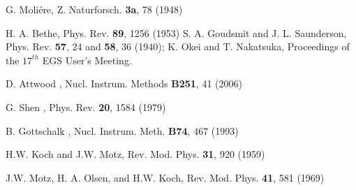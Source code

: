 
%
G. Moli\'{e}re, Z. Naturforsch. {\bf 3a}, 78 (1948)

H. A. Bethe, Phys. Rev. {\bf 89}, 1256 (1953)
S. A. Goudsmit and J. L. Saunderson, Phys. Rev. {\bf 57}, 24 and {\bf 58}, 36 (1940);
K. Okei and T. Nakatsuka, Proceedings of the $17^{th}$ EGS User's Meeting.

D. Attwood \etal, Nucl. Instrum. Methods {\bf B251}, 41 (2006)

G. Shen \etal, Phys. Rev. {\bf 20}, 1584 (1979)

B. Gottschalk \etal, Nucl. Instrum. Meth. {\bf B74}, 467 (1993)

H.W. Koch and J.W. Motz, Rev. Mod. Phys. {\bf 31}, 920 (1959)

J.W. Motz, H. A. Olsen, and H.W. Koch, Rev. Mod. Phys. {\bf 41}, 581 (1969)

